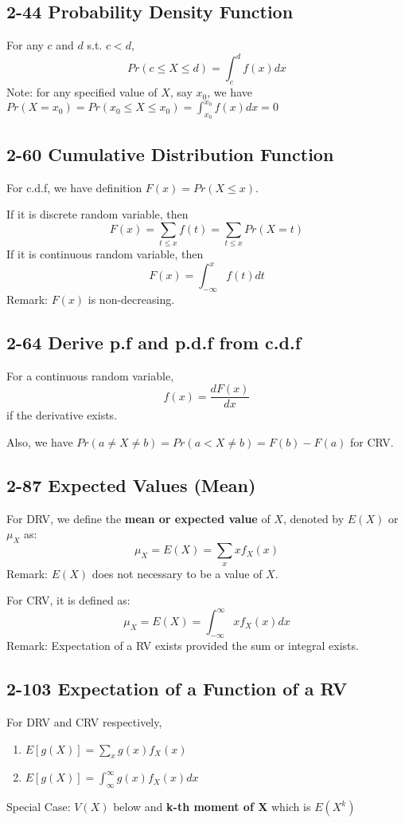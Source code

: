 \documentclass[12pt,landscape]{article}
\begin{document}
\begin{multicols}{3}
    \subsection{2-44 Probability Density Function}
    \label{2-44}
    For any $c$ and $d$ s.t. $c < d$,
        $$ Pr(c \leq X \leq d) = \int_{c}^{d}f(x)dx $$
    Note: for any specified value of $X$, say $x_0$, we have $Pr(X = x_0) = Pr(x_0 \leq X \leq x_0) = \int_{x_0}^{x_0} f(x)dx = 0$
    
    \subsection{2-60 Cumulative Distribution Function}
    For c.d.f, we have definition $F(x) = Pr(X \leq x)$.
    
    If it is discrete random variable, then
        $$ F(x) = \sum_{t \leq x} f(t) = \sum_{t \leq x} Pr(X = t) $$
    If it is continuous random variable, then
        $$ F(x) = \int_{-\infty}^{x} f(t)dt $$
    Remark: $F(x)$ is non-decreasing.

    \subsection{2-64 Derive p.f and p.d.f from c.d.f}
    For a continuous random variable,
        $$ f(x) = \frac{dF(x)}{dx} $$
    if the derivative exists.

    Also, we have $Pr(a \neq X \neq b) = Pr(a < X \neq b) = F(b) - F(a)$ for CRV.

    \subsection{2-87 Expected Values (Mean)}
    For DRV, we define the \textbf{mean or expected value} of $X$, denoted by $E(X)$ or $\mu_X$ as:
        $$ \mu_X = E(X) = \sum_{x} x f_X(x) $$
    Remark: $E(X)$ does not necessary to be a value of $X$.

    For CRV, it is defined as:
        $$ \mu_X = E(X) = \int_{-\infty}^{\infty} x f_X(x) dx $$
    Remark: Expectation of a RV exists provided the sum or integral exists.
    
    \subsection{2-103 Expectation of a Function of a RV}
    For DRV and CRV respectively,
    \begin{enumerate}
        \item $E[g(X)] = \sum_x g(x)f_X(x)$
        \item $E[g(X)] = \int_{\infty}^{\infty} g(x)f_X(x)dx$
    \end{enumerate}
    Special Case: $V(X)$ below and \textbf{k-th moment of X} which is $E(X^k)$


\end{multicols}
\end{document}
